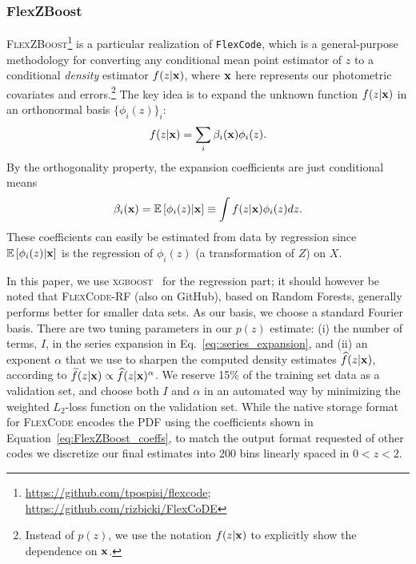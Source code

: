 \subsubsection{FlexZBoost}
\label{sec:flexzboost}

\textsc{FlexZBoost}\footnote{\url{https://github.com/tpospisi/flexcode};\\ \url{https://github.com/rizbicki/FlexCoDE}} \citep{Izbicki:17} is a particular realization of \texttt{FlexCode}, which is a general-purpose methodology for converting any conditional mean point estimator of $z$ to a conditional {\em density} estimator $f(z \vert {\mathbf{x}})$, where ${\mathbf{x}}$ here represents our photometric covariates and errors.\footnote{Instead of $p(z)$, we use the notation $f(z \vert {\mathbf{x}})$ to explicitly show the dependence on ${\mathbf{x}}$.}
The key idea is to expand the unknown function $f(z \vert {\mathbf{x}})$ in an orthonormal basis $\{\phi_i(z)\}_{i}$:
\begin{equation}
f(z|{\mathbf{x}})=\sum_{i}\beta_{i }({\mathbf{x}})\phi_i(z). \label{eq::series_expansion}
\end{equation}
By the orthogonality property, the expansion coefficients are just conditional means
\begin{equation}
\beta_{i }({\mathbf{x}}) =  \mathbb{E}\left[\phi_i(z)|{\mathbf{x}}\right] \equiv \int f(z|{\mathbf{x}})   \phi_i(z) dz. \label{eq:FlexZBoost_coeffs}
\end{equation}
These coefficients can easily be estimated from data by regression since $\mathbb{E}\left[\phi_i(z)|{\mathbf{x}}\right]$ is the regression of $\phi_i(z)$ (a transformation of $Z$) on $X$.

In this paper, we use \textsc{xgboost}~\citep{Chen:16} for the regression part; it should however be noted that \textsc{FlexCode-RF} (also on GitHub), based on Random Forests, generally performs better for smaller data sets.
As our basis, we choose a standard Fourier basis.
There are two tuning parameters in our $p(z)$ estimate: (i) the number of terms, $I$, in the series expansion in Eq.~\ref{eq::series_expansion}, and (ii) an exponent $\alpha$ that we use to sharpen the computed density estimates $\widehat{f}(z|{\mathbf{x}})$, according to $\widetilde{f}(z|{\mathbf{x}}) \propto \widehat{f}(z|{\mathbf{x}})^\alpha$.
We reserve 15\% of the training set data as a validation set, and choose both $I$ and $\alpha$ in an automated way by minimizing the weighted $L_2$-loss function \citep[Eq. 5 in][]{Izbicki:17} on the  validation set.
While the native storage format for \textsc{FlexCode} encodes the PDF using the coefficients shown in Equation~\ref{eq:FlexZBoost_coeffs}, to match the output format requested of other codes we discretize our final estimates into 200 bins linearly spaced in $0 < z < 2$.


